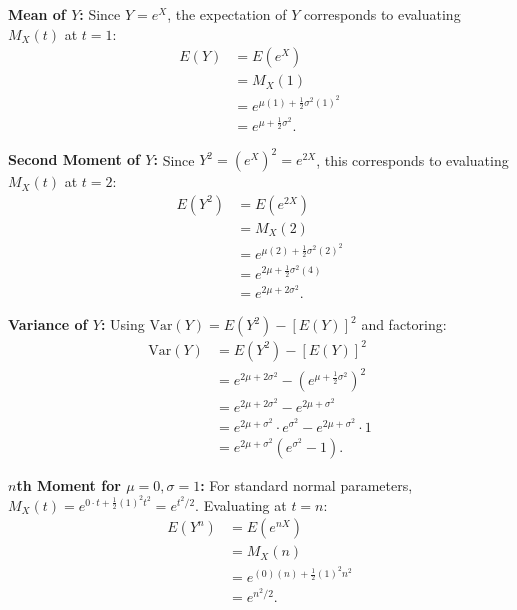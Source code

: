 \documentclass[11pt,a4paper]{article}
\begin{document}
\noindent \textbf{Mean of $Y$:} Since $Y = e^X$, the expectation of $Y$ corresponds to evaluating $M_X(t)$ at $t = 1$:
\begin{align*}
E(Y) &= E\left( e^X \right) \\
&= M_X(1) \\
&= e^{\mu(1) + \frac{1}{2}\sigma^2 (1)^2} \\
&= e^{\mu + \frac{1}{2}\sigma^2}.
\end{align*}

\noindent \textbf{Second Moment of $Y$:} Since $Y^2 = \left(e^X\right)^2 = e^{2X}$, this corresponds to evaluating $M_X(t)$ at $t = 2$:
\begin{align*}
E\left( Y^2 \right) &= E\left( e^{2X} \right) \\
&= M_X(2) \\
&= e^{\mu(2) + \frac{1}{2}\sigma^2 (2)^2} \\
&= e^{2\mu + \frac{1}{2}\sigma^2 (4)} \\
&= e^{2\mu + 2\sigma^2}.
\end{align*}

\noindent \textbf{Variance of $Y$:} Using $\text{Var}(Y) = E(Y^2) - [E(Y)]^2$ and factoring:
\begin{align*}
\text{Var}(Y) &= E\left( Y^2 \right) - \left[ E(Y) \right]^2 \\
&= e^{2\mu + 2\sigma^2} - \left( e^{\mu + \frac{1}{2}\sigma^2} \right)^2 \\
&= e^{2\mu + 2\sigma^2} - e^{2\mu + \sigma^2} \\
&= e^{2\mu + \sigma^2} \cdot e^{\sigma^2} - e^{2\mu + \sigma^2} \cdot 1 \\
&= e^{2\mu + \sigma^2} \left( e^{\sigma^2} - 1 \right).
\end{align*}

\noindent \textbf{$n$th Moment for $\mu = 0, \sigma = 1$:} For standard normal parameters, $M_X(t) = e^{0 \cdot t + \frac{1}{2}(1)^2 t^2} = e^{t^2 / 2}$. Evaluating at $t = n$:
\begin{align*}
E\left( Y^n \right) &= E\left( e^{nX} \right) \\
&= M_X(n) \\
&= e^{(0)(n) + \frac{1}{2}(1)^2 n^2} \\
&= e^{n^2 / 2}.
\end{align*}

\vspace{10pt}
\end{document}
